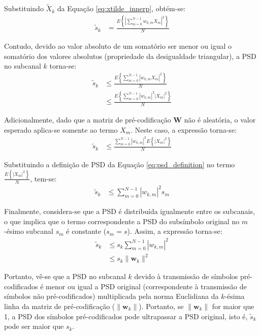 Substituindo $\tilde{X}_k$ da Equação \ref{eq:xtilde_innerp}, obtém-se:
\begin{align}
\tilde{s}_k &=  \frac{E \left\{ \left| \sum \limits_{m=0}^{N-1} w_{k,m} X_m \right|^2 \right\} }{N}
\end{align}

Contudo, devido ao valor absoluto de um somatório ser menor ou igual o somatório dos valores absolutos (propriedade da desigualdade triangular), a PSD no subcanal $k$ torna-se:
\begin{align}
\tilde{s}_k &\leq  \frac{E \left\{  \sum \limits_{m=0}^{N-1} \left|w_{k,m} X_m \right|^2 \right\} }{N} \nonumber\\
&\leq  \frac{E \left\{  \sum \limits_{m=0}^{N-1} \left|w_{k,m} \right|^2 \left|X_m \right|^2 \right\} }{N} \nonumber
\end{align}

Adicionalmente, dado que a matriz de pré-codificação $\mathbf{W}$ não é aleatória, o valor esperado aplica-se somente ao termo $X_m$. Neste caso, a expressão torna-se:
\begin{align}
\tilde{s}_k  &\leq  \frac{\sum \limits_{m=0}^{N-1} \left|w_{k,m} \right|^2 E \left\{  \left|X_m \right|^2 \right\} }{N} \nonumber
\end{align}

Substituindo a definição de PSD da Equação \ref{eq:psd_definition} no termo $\frac{E \left\{  \left|X_m \right|^2 \right\} }{N}$, tem-se:
\begin{align}
\tilde{s}_k  &\leq  \sum \limits_{m=0}^{N-1} \left|w_{k,m} \right|^2 s_m \nonumber
\end{align}

Finalmente, considera-se que a PSD é distribuída igualmente entre os subcanais, o que implica que o termo correspondente a PSD do subsímbolo original no $m$-ésimo subcanal $s_m$ é constante ($s_m = s$). Assim, a expressão torna-se:
\begin{align}
\tilde{s}_k  &\leq  s_k \sum \limits_{m=0}^{N-1} \left|w_{k,m} \right|^2  \nonumber\\
&\leq  s_k \| \mathbf{w}_k \|^2 
\label{eq:psd_bound}
\end{align}

Portanto, vê-se que a PSD no subcanal $k$ devido à transmissão de símbolos pré-codificados é menor ou igual a PSD original (correspondente à transmissão de símbolos não pré-codificados) multiplicada pela norma Euclidiana da $k$-ésima linha da matriz de pré-codificação ($\| \mathbf{w}_k \|$). Portanto, se $\| \mathbf{w}_k \|$ for maior que 1, a PSD dos símbolos pré-codificados pode ultrapassar a PSD original, isto é, $\tilde{s}_k$ pode ser maior que $s_k$. 

